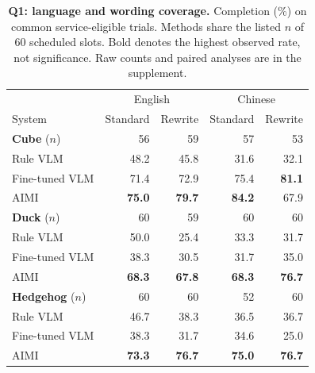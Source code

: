 \begin{table}[t]
\centering\footnotesize
\setlength{\tabcolsep}{2pt}
\begin{tabular*}{\linewidth}{@{}l@{\extracolsep{\fill}}rrrr@{}}
\toprule
 & \multicolumn{2}{c}{English} & \multicolumn{2}{c}{Chinese}\\
System & Standard & Rewrite & Standard & Rewrite\\
\midrule
\textbf{Cube} ($n$) & 56 & 59 & 57 & 53\\
Rule VLM & 48.2 & 45.8 & 31.6 & 32.1\\
Fine-tuned VLM & 71.4 & 72.9 & 75.4 & \textbf{81.1}\\
AIMI & \textbf{75.0} & \textbf{79.7} & \textbf{84.2} & 67.9\\
\midrule
\textbf{Duck} ($n$) & 60 & 59 & 60 & 60\\
Rule VLM & 50.0 & 25.4 & 33.3 & 31.7\\
Fine-tuned VLM & 38.3 & 30.5 & 31.7 & 35.0\\
AIMI & \textbf{68.3} & \textbf{67.8} & \textbf{68.3} & \textbf{76.7}\\
\midrule
\textbf{Hedgehog} ($n$) & 60 & 60 & 52 & 60\\
Rule VLM & 46.7 & 38.3 & 36.5 & 36.7\\
Fine-tuned VLM & 38.3 & 31.7 & 34.6 & 25.0\\
AIMI & \textbf{73.3} & \textbf{76.7} & \textbf{75.0} & \textbf{76.7}\\
\bottomrule
\end{tabular*}
\caption{\textbf{Q1: language and wording coverage.} Completion (\%) on common service-eligible trials. Methods share the listed $n$ of 60 scheduled slots. Bold denotes the highest observed rate, not significance. Raw counts and paired analyses are in the supplement.}
\label{tab:language-objects}
\end{table}
